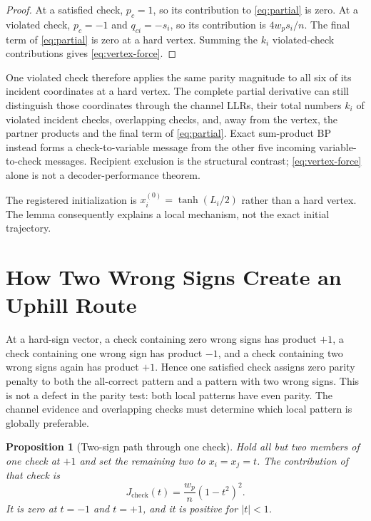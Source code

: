 \documentclass[11pt]{article}
\newtheorem{proposition}{Proposition}
\theoremstyle{remark}
\begin{document}
\begin{proof}
At a satisfied check, $p_c=1$, so its contribution to
\cref{eq:partial} is zero.  At a violated check, $p_c=-1$ and
$q_{ci}=-s_i$, so its contribution is $4w_ps_i/n$.  The final term of
\cref{eq:partial} is zero at a hard vertex.  Summing the $k_i$ violated-check
contributions gives \cref{eq:vertex-force}.
\end{proof}

One violated check therefore applies the same parity magnitude to all six of
its incident coordinates at a hard vertex.  The complete partial derivative
can still distinguish those coordinates through the channel LLRs, their total
numbers $k_i$ of violated incident checks, overlapping checks, and, away from
the vertex, the partner products and the final term of \cref{eq:partial}.
Exact sum-product BP instead forms a check-to-variable message from the other
five incoming variable-to-check messages.  Recipient exclusion is the
structural contrast; \cref{eq:vertex-force} alone is not a decoder-performance
theorem.

The registered initialization is $x_i^{(0)}=\tanh(L_i/2)$ rather than a hard
vertex.  The lemma consequently explains a local mechanism, not the exact
initial trajectory.

\section{How Two Wrong Signs Create an Uphill Route}

At a hard-sign vector, a check containing zero wrong signs has product $+1$,
a check containing one wrong sign has product $-1$, and a check containing two
wrong signs again has product $+1$.  Hence one satisfied check assigns zero
parity penalty to both the all-correct pattern and a pattern with two wrong
signs.
This is not a defect in the parity test: both local patterns have even parity.
The channel evidence and overlapping checks must determine which local pattern
is globally preferable.

\begin{proposition}[Two-sign path through one check]
Hold all but two members of one check at $+1$ and set the remaining two to
$x_i=x_j=t$.  The contribution of that check is
\begin{equation}
J_{\mathrm{check}}(t)=\frac{w_p}{n}(1-t^2)^2.
\label{eq:pair-path}
\end{equation}
It is zero at $t=-1$ and $t=+1$, and it is positive for $|t|<1$.
\end{proposition}
\end{document}
